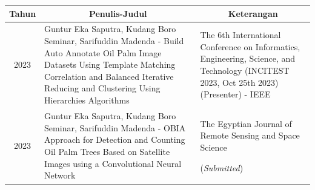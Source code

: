 \begin{table}[H]
	\begin{tabular}{|c|p{6cm}|p{5.7cm}|}
		\hline
		\textbf{Tahun} &
		\multicolumn{1}{c|}{\textbf{Penulis-Judul}} &
		\multicolumn{1}{c|}{\textbf{Keterangan}} \\ \hline
		2023 & Guntur Eka Saputra, Kudang Boro Seminar, Sarifuddin Madenda - Build Auto Annotate Oil Palm Image Datasets Using Template Matching Correlation and Balanced Iterative Reducing and Clustering Using Hierarchies Algorithms
 & The 6th International Conference on Informatics, Engineering, Science, and Technology (INCITEST 2023, Oct 25th 2023)
 (Presenter) - IEEE\\ \hline
		2023 &  Guntur Eka Saputra, Kudang Boro Seminar, Sarifuddin Madenda - OBIA Approach for Detection and Counting Oil Palm Trees Based on Satellite Images using a Convolutional Neural Network  & The Egyptian Journal of Remote Sensing and Space Science
		
		(\textit{Submitted})\\ \hline

	\end{tabular}%
\end{table}


 



